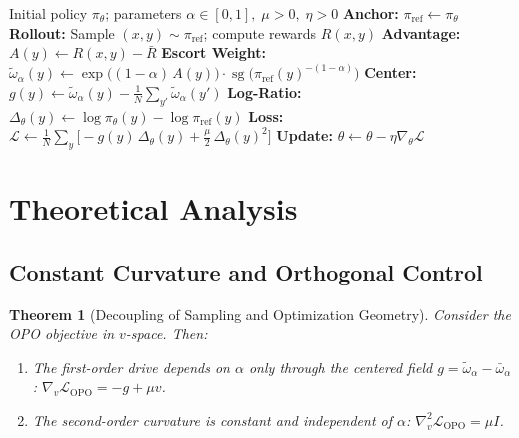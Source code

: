 \documentclass[11pt]{article}
\newtheorem{theorem}{Theorem}[section]
\theoremstyle{definition}
\theoremstyle{remark}
\newcommand{\loss}{\mathcal{L}}
\newcommand{\piref}{\pi_{\mathrm{ref}}}
\begin{document}
\begin{algorithm}[htbp]
\caption{Orthogonalized Policy Optimization (OPO)}
\label{alg:opo}
\begin{algorithmic}[1]
\Require Initial policy $\pi_\theta$; parameters $\alpha \in [0,1],\; \mu > 0,\; \eta > 0$
    \State \textbf{Anchor:} $\piref \leftarrow \pi_\theta$ 
    \State \textbf{Rollout:} Sample $(x, y) \sim \piref$; compute rewards $R(x, y)$ 
    \State \textbf{Advantage:} $A(y) \leftarrow R(x,y) - \bar{R}$ 
    \State \textbf{Escort Weight:} $\tilde{\omega}_\alpha(y) \leftarrow \exp\!\big((1{-}\alpha)\, A(y)\big) \cdot \operatorname{sg}\!\big(\piref(y)^{-(1-\alpha)}\big)$ 
    \State \textbf{Center:} $g(y) \leftarrow \tilde{\omega}_\alpha(y) - \frac{1}{N}\sum_{y'}\tilde{\omega}_\alpha(y')$ 
    \State \textbf{Log-Ratio:} $\Delta_\theta(y) \leftarrow \log \pi_\theta(y) - \log \piref(y)$ 
    \State \textbf{Loss:} $\mathcal{L} \leftarrow \frac{1}{N} \sum_y \big[ -g(y)\, \Delta_\theta(y) + \frac{\mu}{2}\, \Delta_\theta(y)^2 \big]$
    \State \textbf{Update:} $\theta \leftarrow \theta - \eta \nabla_\theta \mathcal{L}$
\EndFor
\end{algorithmic}
\end{algorithm}

\section{Theoretical Analysis}
\label{sec:analysis}

\subsection{Constant Curvature and Orthogonal Control}

\begin{theorem}[Decoupling of Sampling and Optimization Geometry]
\label{thm:decoupling}
Consider the OPO objective in $v$-space.
Then:
\begin{enumerate}[nosep]
\item The first-order drive depends on $\alpha$ only through the centered field $g = \tilde{\omega}_\alpha - \bar{\omega}_\alpha$:
$\nabla_v \loss_{\mathrm{OPO}} = -g + \mu v$.
\item The second-order curvature is constant and independent of $\alpha$:
$\nabla_v^2 \loss_{\mathrm{OPO}} = \mu I$.
\end{enumerate}
\end{theorem}
\end{document}
